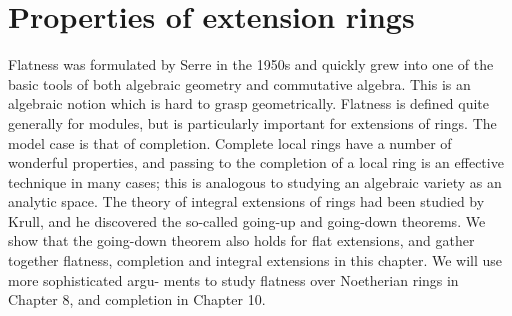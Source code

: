 \chapter{Properties of extension rings}\label{ch:3}

Flatness was formulated by Serre in the 1950s and quickly grew into one of
the basic tools of both algebraic geometry and commutative algebra. This is
an algebraic notion which is hard to grasp geometrically. Flatness is defined
quite generally for modules, but is particularly important for extensions of
rings. The model case is that of completion. Complete local rings have a
number of wonderful properties, and passing to the completion of a local
ring is an effective technique in many cases; this is analogous to studying an
algebraic variety as an analytic space. The theory of integral extensions of
rings had been studied by Krull, and he discovered the so-called going-up
and going-down theorems. We show that the going-down theorem also
holds for flat extensions, and gather together flatness, completion and
integral extensions in this chapter. We will use more sophisticated argu-
ments to study flatness over Noetherian rings in Chapter 8, and completion
in Chapter 10. %





